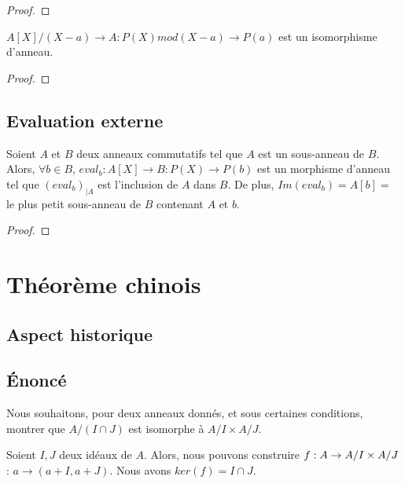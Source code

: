 \ifdefined\outputproof
\begin{proof}

\end{proof}
\fi

\begin{proposition}
	$A[X] / (X - a) \rightarrow A : P(X) mod(X - a) \rightarrow P(a)$ est un
	isomorphisme d'anneau.
\end{proposition}

\ifdefined\outputproof
\begin{proof}

\end{proof}
\fi

\subsection{Evaluation externe}

\begin{proposition}
	Soient $A$ et $B$ deux anneaux commutatifs tel que $A$ est un sous-anneau de
	$B$. Alors, $\forall b \in B$, $eval_{b} : A[X] \rightarrow B : P(X)
	\rightarrow P(b)$ est un morphisme d'anneau tel que ${(eval_{b})}_{|A}$ est
	l'inclusion de $A$ dans $B$. De plus, $Im(eval_{b}) = A[b] = $ le plus petit
	sous-anneau de $B$ contenant $A$ et $b$. %
\end{proposition}

\ifdefined\outputproof
\begin{proof}

\end{proof}
\fi


\section{Théorème chinois}

\subsection{Aspect historique}

\subsection{Énoncé}
Nous souhaitons, pour deux anneaux donnés, et sous certaines conditions, montrer
que $A/(I \cap J)$ est isomorphe à $A/I \times A/J$.

Soient $I, J$ deux idéaux de $A$. Alors, nous pouvons construire
$f : A \rightarrow A/I \times A/J$ : $a \rightarrow (a + I, a + J)$.
Nous avons $ker(f) = I \cap J$.


